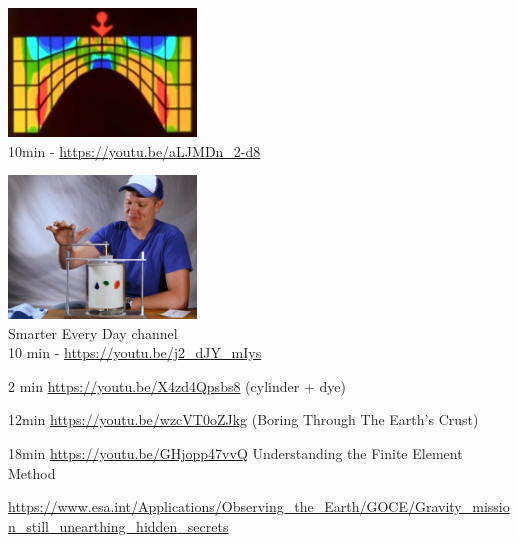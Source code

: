
\begin{center}
\includegraphics[width=5cm]{images/youtube/superold}\\
10min - \url{https://youtu.be/aLJMDn_2-d8}
\end{center}

\begin{center}
\includegraphics[width=5cm]{images/youtube/smarter}\\
Smarter Every Day channel\\
10 min - \url{https://youtu.be/j2_dJY_mIys}
\end{center}


2 min \url{https://youtu.be/X4zd4Qpsbs8} (cylinder + dye)

12min \url{https://youtu.be/wzcVT0oZJkg} (Boring Through The Earth's Crust)

18min \url{https://youtu.be/GHjopp47vvQ} Understanding the Finite Element Method

\url{https://www.esa.int/Applications/Observing_the_Earth/GOCE/Gravity_mission_still_unearthing_hidden_secrets}
